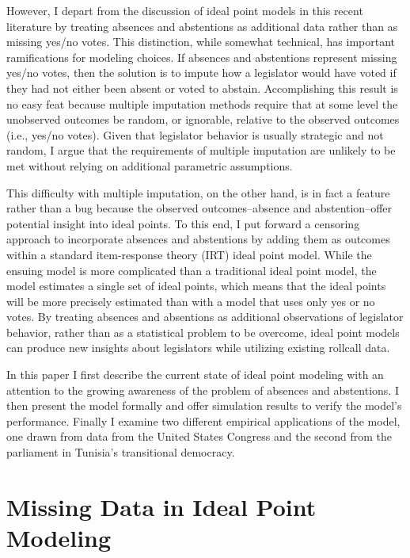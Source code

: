 	However, I depart from the discussion of ideal point models in this recent literature by treating absences and abstentions as additional data rather than as missing yes/no votes. This distinction, while somewhat technical, has important ramifications for modeling choices. If absences and abstentions represent missing yes/no votes, then the solution is to impute how a legislator would have voted if they had not either been absent or voted to abstain. Accomplishing this result is no easy feat because multiple imputation methods require that at some level the unobserved outcomes be random, or ignorable, relative to the observed outcomes (i.e., yes/no votes). Given that legislator behavior is usually strategic and not random, I argue that the requirements of multiple imputation are unlikely to be met without relying on additional parametric assumptions. 
	
	This difficulty with multiple imputation, on the other hand, is in fact a feature rather than a bug because the observed outcomes--absence and abstention--offer potential insight into ideal points. To this end, I put forward a censoring approach to incorporate absences and abstentions by adding them as outcomes within a standard item-response theory (IRT) ideal point model. While the ensuing model is more complicated than a traditional ideal point model, the model estimates a single set of ideal points, which means that the ideal points will be more precisely estimated than with a model that uses only yes or no votes. By treating absences and absentions as additional observations of legislator behavior, rather than as a statistical problem to be overcome, ideal point models can produce new insights about legislators while utilizing existing rollcall data.
	
	In this paper I first describe the current state of ideal point modeling with an attention to the growing awareness of the problem of absences and abstentions. I then present the model formally and offer simulation results to verify the model's performance. Finally I examine two different empirical applications of the model, one drawn from data from the United States Congress and the second from the parliament in Tunisia's transitional democracy.
	
	\section{Missing Data in Ideal Point Modeling}
	
